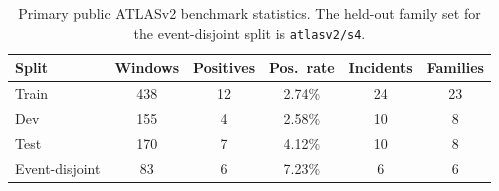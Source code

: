 \begin{table}[t]
\centering
\small
\setlength{\tabcolsep}{3.8pt}
\caption{Primary public ATLASv2 benchmark statistics. The held-out family set for the event-disjoint split is \texttt{atlasv2/s4}.}
\label{tab:atlasv2-public-stats}
\begin{tabular}{lccccc}
\toprule
Split & Windows & Positives & Pos.\ rate & Incidents & Families \\
\midrule
Train & 438 & 12 & 2.74\% & 24 & 23 \\
Dev & 155 & 4 & 2.58\% & 10 & 8 \\
Test & 170 & 7 & 4.12\% & 10 & 8 \\
Event-disjoint & 83 & 6 & 7.23\% & 6 & 6 \\
\bottomrule
\end{tabular}
\end{table}
